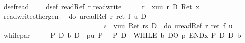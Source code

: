 \begin{isabellebody}
\isanewline
{}\isanewline
dsef{\isacharunderscore}read{\isacharcolon}\ \ \ \ \ {\isachardoublequote}dsef\ {\isacharparenleft}readRef\ r{\isacharparenright}{\isachardoublequote}\isanewline
read{\isacharunderscore}write{\isacharcolon}\ \ \ \ {\isachardoublequote}{\isasymturnstile}\ {\isacharbrackleft}{\isacharhash}\ r\ {\isacharcolon}{\isacharequal}\ x{\isacharbrackright}{\isacharparenleft}{\isasymlambda}uu{\isachardot}\ {\isacharasterisk}r\ {\isacharequal}\isactrlsub D\ Ret\ x{\isacharparenright}{\isachardoublequote}\isanewline
read{\isacharunderscore}write{\isacharunderscore}other{\isacharunderscore}gen{\isacharcolon}\ {\isachardoublequote}{\isasymturnstile}\ {\isasymUp}\ {\isacharparenleft}do\ {\isacharbraceleft}u{\isasymleftarrow}readRef\ r{\isacharsemicolon}\ ret\ {\isacharparenleft}f\ u{\isacharparenright}{\isacharbraceright}{\isacharparenright}\ {\isasymlongrightarrow}\isactrlsub D\ \isanewline
\ \ \ \ \ \ \ \ \ \ \ \ \ \ \ \ \ \ \ \ \ \ \ \ \ \ \ \ {\isacharbrackleft}{\isacharhash}\ s\ {\isacharcolon}{\isacharequal}\ y{\isacharbrackright}{\isacharparenleft}{\isasymlambda}uu{\isachardot}\ Ret\ {\isacharparenleft}r{\isasymnoteq}s{\isacharparenright}\ {\isasymlongrightarrow}\isactrlsub D\ {\isasymUp}\ {\isacharparenleft}do\ {\isacharbraceleft}u{\isasymleftarrow}readRef\ r{\isacharsemicolon}\ ret\ {\isacharparenleft}f\ u{\isacharparenright}{\isacharbraceright}{\isacharparenright}{\isacharparenright}{\isachardoublequote}\isanewline
while{\isacharunderscore}par{\isacharcolon}\ \ \ \ \ {\isachardoublequote}{\isasymturnstile}\ P\ {\isasymand}\isactrlsub D\ b\ {\isasymlongrightarrow}\isactrlsub D\ {\isacharbrackleft}{\isacharhash}\ p{\isacharbrackright}{\isacharparenleft}{\isasymlambda}u{\isachardot}\ P{\isacharparenright}\ {\isasymLongrightarrow}\ {\isasymturnstile}\ P\ {\isasymlongrightarrow}\isactrlsub D\ {\isacharbrackleft}{\isacharhash}\ WHILE\ b\ DO\ p\ END{\isacharbrackright}{\isacharparenleft}{\isasymlambda}x{\isachardot}\ P\ {\isasymand}\isactrlsub D\ {\isasymnot}\isactrlsub D\ b{\isacharparenright}{\isachardoublequote}\isanewline
\end{isabellebody}

